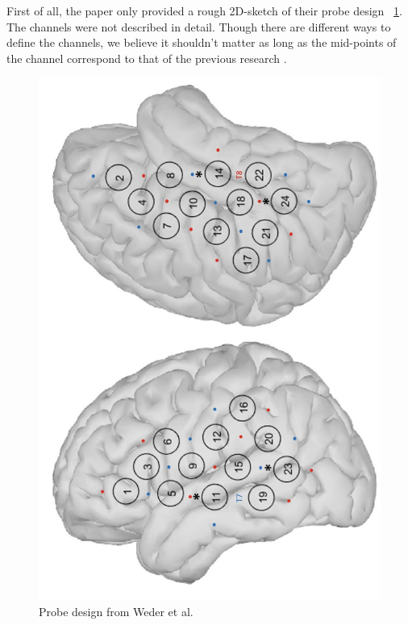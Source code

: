 First of all, the paper only provided a rough 2D-sketch of their probe design ~\ref{fig:WederProbe}. The channels were not described in detail. Though there are different ways to define the channels, we believe it shouldn't matter as long as the mid-points of the channel correspond to that of the previous research \cite {Weder2018}.

\begin{figure}[H]
  \centering
  \includegraphics[scale= 0.4]{bilder/weder_probe.jpg}
  \caption{Probe design from Weder et al. \citeyear{Weder2018}}
  \label{fig:WederProbe}
\end{figure}

